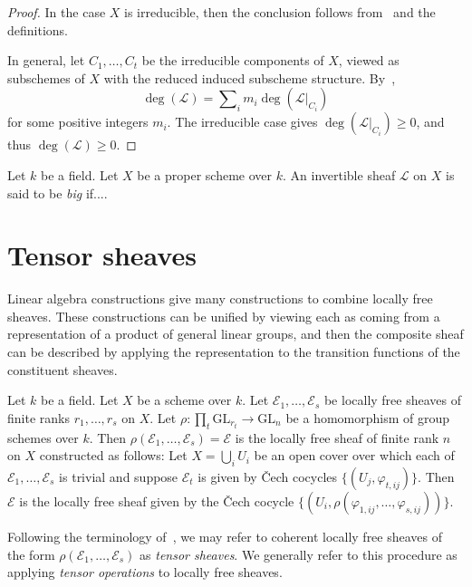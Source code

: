 \begin{proof}
In the case $X$ is irreducible, then the conclusion follows from~
and the definitions.

In general, let $C_1,\ldots,C_t$ be the irreducible components of $X$, viewed
as subschemes of $X$ with the reduced induced subscheme structure.
By~,
$$
\deg(\mathcal{L}) = \sum\nolimits_i m_i\deg(\mathcal{L}|_{C_i})
$$
for some positive integers $m_i$.
The irreducible case gives $\deg(\mathcal{L}|_{C_i}) \geq 0$, and thus
$\deg(\mathcal{L}) \geq 0$.
\end{proof}

\begin{definition}
Let $k$ be a field.
Let $X$ be a proper scheme over $k$.
An invertible sheaf $\mathcal{L}$ on $X$ is said to be \emph{big}
if....
\end{definition}

\section{Tensor sheaves}
\label{section-tensor-sheaves}
Linear algebra constructions give many constructions to combine locally free
sheaves.
These constructions can be unified by viewing each as coming from a
representation of a product of general linear groups, and then the composite
sheaf can be described by applying the representation to the transition
functions of the constituent sheaves.

\begin{definition}
\label{definition-tensor-sheaf}
Let $k$ be a field.
Let $X$ be a scheme over $k$.
Let $\mathcal{E}_1,\ldots,\mathcal{E}_s$ be locally free sheaves of finite
ranks $r_1,\ldots,r_s$ on $X$.
Let $\rho : \prod_t \mathrm{GL}_{r_t} \to \mathrm{GL}_n$ be a homomorphism of
group schemes over $k$.
Then $\rho(\mathcal{E}_1,\ldots,\mathcal{E}_s) = \mathcal{E}$ is the
locally free sheaf of finite rank $n$ on $X$ constructed as follows:
Let $X = \bigcup_i U_i$ be an open cover over which each of
$\mathcal{E}_1,\ldots,\mathcal{E}_s$ is trivial and suppose $\mathcal{E}_t$ is
given by \v{C}ech cocycles $\{(U_j,\varphi_{t,ij})\}$.
Then $\mathcal{E}$ is the locally free sheaf given by the \v{C}ech cocycle
$\{(U_i,\rho(\varphi_{1,ij},\ldots,\varphi_{s,ij}))\}$.
\end{definition}

Following the terminology of~\cite[p.76]{hartshorne_ample_vb}, we may refer to
coherent locally free sheaves of the form
$\rho(\mathcal{E}_1,\ldots,\mathcal{E}_s)$ as \emph{tensor sheaves}.
We generally refer to this procedure as applying \emph{tensor operations}
to locally free sheaves.

